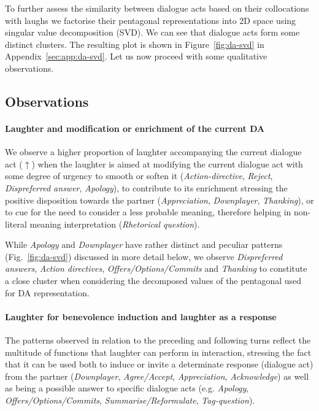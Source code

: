 \documentclass[11pt,a4paper]{article}
\begin{document}
To further assess the similarity between dialogue acts based on their
collocations with laughs we factorise their pentagonal representations
into 2D space using singular value decomposition (SVD). We can see
that dialogue acts form some distinct clusters.
The resulting plot is
shown in Figure~\ref{fig:da-svd} in Appendix~\ref{sec:app:da-svd}. Let
us now proceed with some qualitative observations.


\subsection{Observations}
\label{sec:observations}
\paragraph{Laughter and modification or enrichment of the current DA}
We observe a higher proportion of laughter accompanying the current
dialogue act ($\uparrow$) when the laughter is aimed at modifying
the current dialogue act with some degree of urgency to
smooth or soften it (\emph{Action-directive}, \emph{Reject},
\emph{Dispreferred answer}, \emph{Apology}), to contribute to its
enrichment stressing the positive disposition towards the partner
(\emph{Appreciation}, \emph{Downplayer}, \emph{Thanking}), or to cue
for the need to consider a less probable meaning, therefore helping
in non-literal meaning interpretation (\emph{Rhetorical question}).
 
While \emph{Apology} and \emph{Downplayer} have rather distinct and peculiar
patterns (Fig.~\ref{fig:da-svd}) discussed in more detail below, we
observe \emph{Dispreferred answers}, \emph{Action directives},
\emph{Offers/Options/Commits} and \emph{Thanking} to constitute a
close cluster when considering the decomposed values of the pentagonal
used for DA representation.%
 
\paragraph{Laughter for benevolence induction and laughter as a response}
The patterns observed in relation to the preceding and following
turns reflect the multitude of functions that
laughter can perform in interaction, stressing the fact that it can be
used both to induce or invite a determinate response (dialogue act) from
the partner (\emph{Downplayer}, \emph{Agree/Accept}, \emph{Appreciation}, \emph{Acknowledge})
as well as being a possible answer to specific dialogue acts
(e.g. \emph{Apology}, \emph{Offers/Options/Commits}, \emph{Summarise/Reformulate},
\emph{Tag-question}).
\end{document}
